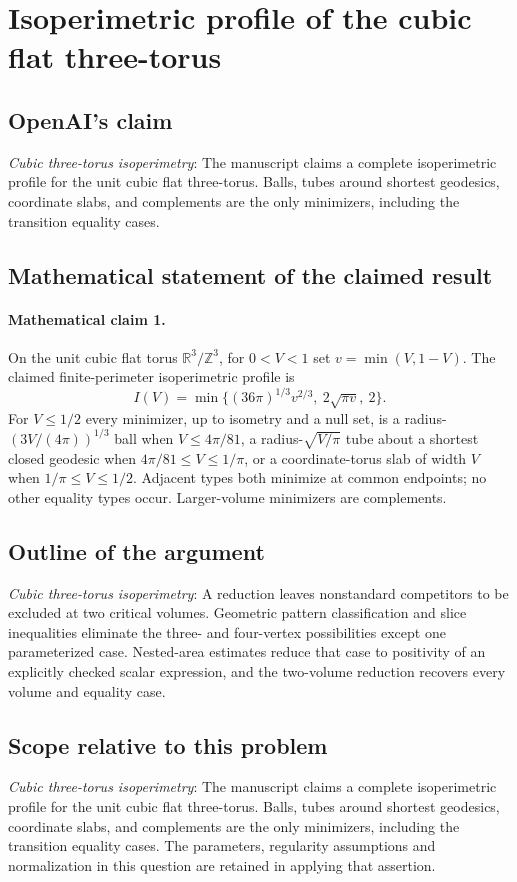 \documentclass[11pt]{article}
\begin{document}
\section*{Isoperimetric profile of the cubic flat three-torus}

\subsection{OpenAI's claim}
\textit{Cubic three-torus isoperimetry}: The manuscript claims a complete isoperimetric profile for the unit cubic flat three-torus. Balls, tubes around shortest geodesics, coordinate slabs, and complements are the only minimizers, including the transition equality cases.

\subsection{Mathematical statement of the claimed result}
\paragraph{Mathematical claim 1.} On the unit cubic flat torus $\mathbb R^3/\mathbb Z^3$, for $0<V<1$ set $v=\min(V,1-V)$. The claimed finite-perimeter isoperimetric profile is \[I(V)=\min\{(36\pi)^{1/3}v^{2/3},\ 2\sqrt{\pi v},\ 2\}.\] For $V\le1/2$ every minimizer, up to isometry and a null set, is a radius-$(3V/(4\pi))^{1/3}$ ball when $V\le4\pi/81$, a radius-$\sqrt{V/\pi}$ tube about a shortest closed geodesic when $4\pi/81\le V\le1/\pi$, or a coordinate-torus slab of width $V$ when $1/\pi\le V\le1/2$. Adjacent types both minimize at common endpoints; no other equality types occur. Larger-volume minimizers are complements.

\subsection{Outline of the argument}
\textit{Cubic three-torus isoperimetry}: A reduction leaves nonstandard competitors to be excluded at two critical volumes. Geometric pattern classification and slice inequalities eliminate the three- and four-vertex possibilities except one parameterized case. Nested-area estimates reduce that case to positivity of an explicitly checked scalar expression, and the two-volume reduction recovers every volume and equality case.

\subsection{Scope relative to this problem}
\textit{Cubic three-torus isoperimetry}: The manuscript claims a complete isoperimetric profile for the unit cubic flat three-torus. Balls, tubes around shortest geodesics, coordinate slabs, and complements are the only minimizers, including the transition equality cases. The parameters, regularity assumptions and normalization in this question are retained in applying that assertion.
\end{document}
